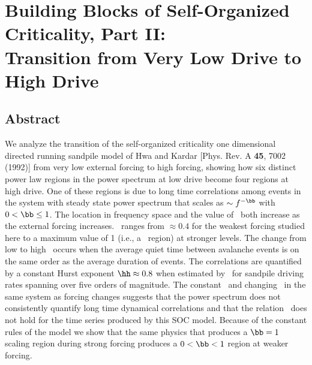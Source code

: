 \chapter{Building Blocks of Self-Organized Criticality, Part II: \\
  Transition from Very Low Drive to High Drive}
\label{sec:partII}

\bigskip

\section*{Abstract}
\label{sec:partII_abstract}

We analyze the transition of the self-organized criticality one
dimensional directed running sandpile model of Hwa and Kardar [Phys.
Rev. A {\bf 45}, 7002 (1992)] from very low external forcing to high
forcing, showing how six distinct power law regions in the power
spectrum at low drive become four regions at high drive.  One of these
regions is due to long time correlations among events in the system
with steady state power spectrum that scales as $\sim f^{- \bb}$ with
$0 < \bb \leq 1$.  The location in frequency space and the value of
\bb\ both increase as the external forcing increases.  \bb\ ranges
from $\approx 0.4$ for the weakest forcing studied here to a maximum
value of 1 (i.e., a \ff\ region) at stronger levels.  The change from
low to high \bb\ occurs when the average quiet time between avalanche
events is on the same order as the average duration of events.  The
correlations are quantified by a constant Hurst exponent $\hh \approx
0.8$ when estimated by \rsa\ for sandpile driving rates spanning over
five orders of magnitude.  The constant \hh\ and changing \bb\ in the
same system as forcing changes suggests that the power spectrum does
not consistently quantify long time dynamical correlations and that
the relation \bbh\ does not hold for the time series produced by this
SOC model.  Because of the constant rules of the model we show that
the same physics that produces a $\bb = 1$ scaling region during
strong forcing produces a $0 < \bb < 1$ region at weaker forcing.


